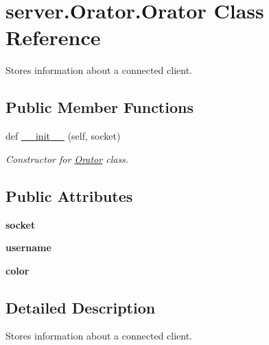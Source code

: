 \hypertarget{classserver_1_1Orator_1_1Orator}{}\section{server.\+Orator.\+Orator Class Reference}
\label{classserver_1_1Orator_1_1Orator}


Stores information about a connected client.  


\subsection*{Public Member Functions}
\begin{DoxyCompactItemize}
\item 
def \hyperlink{classserver_1_1Orator_1_1Orator_a48bde9c3fe2ea180e7b0d758211803f7}{\+\_\+\+\_\+init\+\_\+\+\_\+} (self, socket)
\begin{DoxyCompactList}\small\item\em Constructor for \hyperlink{classserver_1_1Orator_1_1Orator}{Orator} class. \end{DoxyCompactList}\end{DoxyCompactItemize}
\subsection*{Public Attributes}
\begin{DoxyCompactItemize}
\item 
{\bfseries socket}\hypertarget{classserver_1_1Orator_1_1Orator_a32fdd1294852bd6f879b424fceac162e}{}\label{classserver_1_1Orator_1_1Orator_a32fdd1294852bd6f879b424fceac162e}

\item 
{\bfseries username}\hypertarget{classserver_1_1Orator_1_1Orator_a644ae940ba661f69b721deb635549f21}{}\label{classserver_1_1Orator_1_1Orator_a644ae940ba661f69b721deb635549f21}

\item 
{\bfseries color}\hypertarget{classserver_1_1Orator_1_1Orator_a1a5fc663a1e5aaa7d58fbcf05829d882}{}\label{classserver_1_1Orator_1_1Orator_a1a5fc663a1e5aaa7d58fbcf05829d882}

\end{DoxyCompactItemize}


\subsection{Detailed Description}
Stores information about a connected client. 

